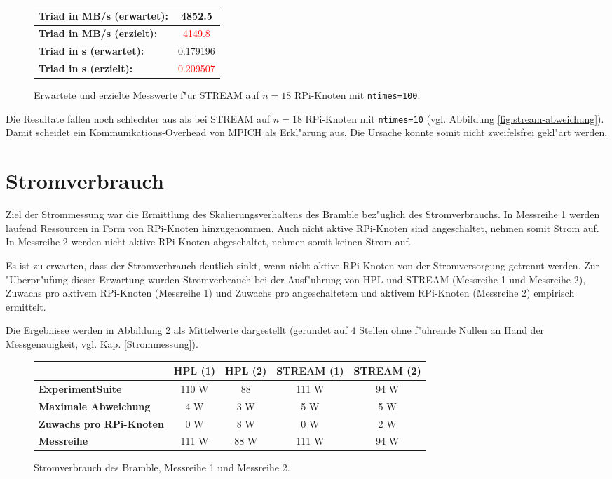 \begin{enumerate}
\begin{figure}[H]
\begin{tabular}{|l|c|}
    \hline 
    \textbf{Triad in MB/s (erwartet):} & 4852.5\\
    \hline 
    \textbf{Triad in MB/s (erzielt):} & \textcolor{red}{4149.8}\\
    \hline 
    \textbf{Triad in s (erwartet):} & 0.179196\\
    \hline 
    \textbf{Triad in s (erzielt):} & \textcolor{red}{0.209507}\\
    \hline 
  \end{tabular}
  \caption{Erwartete und erzielte Messwerte f"ur STREAM auf $n=18$ RPi-Knoten mit \texttt{ntimes=100}.}\label{fig:stream-ntimes100}
\end{figure}
\noindent
Die Resultate fallen noch schlechter aus als bei STREAM auf $n=18$ RPi-Knoten mit \texttt{ntimes=10} (vgl. Abbildung \ref{fig:stream-abweichung}). Damit scheidet ein Kommunikations-Overhead von MPICH als Erkl"arung aus. Die Ursache konnte somit nicht zweifelsfrei gekl"art werden. 
\end{enumerate}

\section{Stromverbrauch}
Ziel der Strommessung war die Ermittlung des Skalierungsverhaltens des Bramble bez"uglich des Stromverbrauchs. In Messreihe 1 werden laufend Ressourcen in Form von RPi-Knoten hinzugenommen. Auch nicht aktive RPi-Knoten sind angeschaltet, nehmen somit Strom auf. In Messreihe 2 werden nicht aktive RPi-Knoten abgeschaltet, nehmen somit keinen Strom auf. 

Es ist zu erwarten, dass der Stromverbrauch deutlich sinkt, wenn nicht aktive RPi-Knoten von der Stromversorgung getrennt werden. Zur "Uberpr"ufung dieser Erwartung wurden Stromverbrauch bei der Ausf"uhrung von HPL und STREAM (Messreihe 1 und Messreihe 2), Zuwachs pro aktivem RPi-Knoten (Messreihe 1) und Zuwachs pro angeschaltetem und aktivem RPi-Knoten (Messreihe 2) empirisch ermittelt. 

Die Ergebnisse werden in Abbildung \ref{fig:stromvergleich} als Mittelwerte dargestellt (gerundet auf 4 Stellen ohne f"uhrende Nullen an Hand der Messgenauigkeit, vgl. Kap. \ref{Strommessung}). 
\begin{figure}[H]
  \centering
  \begin{tabular}{|l|c|c|c|c|}
    \hline 
    & HPL (1) & HPL (2) & STREAM (1) & STREAM (2)\\ 
    \hline 
	\textbf{ExperimentSuite} & 110 W & 88 & 111 W & 94 W\\
    \hline 
    \textbf{Maximale Abweichung} & 4 W & 3 W & 5 W & 5 W\\
	\hline
    \textbf{Zuwachs pro RPi-Knoten} & 0 W & 8 W & 0 W & 2 W\\
    \hline 
    \textbf{Messreihe} & 111 W & 88 W & 111 W & 94 W\\
    \hline 
  \end{tabular}
  \caption{Stromverbrauch des Bramble, Messreihe 1 und Messreihe 2.}
\label{fig:stromvergleich}
\end{figure}
\noindent

